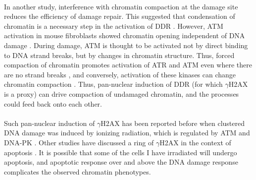 \paragraph*{} In another study, interference with chromatin compaction at the damage site reduces the efficiency of damage repair. This suggested that condensation of chromatin is a necessary step in the activation of DDR \cite{BURGESS20141703}. However, ATM activation in mouse fibroblasts showed chromatin opening independent of DNA damage \cite{ji2017baf60b}. During damage, ATM is thought to be activated not by direct binding to DNA strand breaks, but by changes in chromatin structure. Thus, forced compaction of chromatin promotes activation of ATR and ATM even where there are no strand breaks \cite{BURGESS20141703}, and conversely, activation of these kinases can change chromatin compaction \cite{becker2014atm}. Thus, pan-nuclear induction of DDR (for which $\gamma$H2AX is a proxy) can drive compaction of undamaged chromatin, and the processes could feed back onto each other.

\paragraph*{} Such pan-nuclear induction of $\gamma$H2AX has been reported before when clustered DNA damage was induced by ionizing radiation, which is regulated by ATM and DNA-PK \cite{meyer2013clustered}. Other studies have discussed a ring of $\gamma$H2AX in the context of apoptosis \cite{solier2014nuclear}. It is possible that some of the cells I have irradiated will undergo apoptosis, and apoptotic response over and above the DNA damage response complicates the observed chromatin phenotypes.

